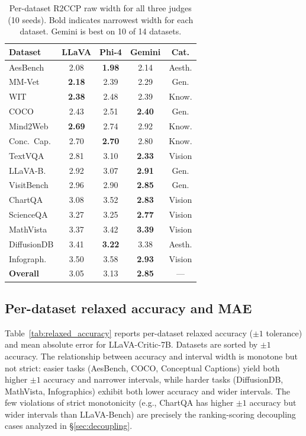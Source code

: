 \documentclass{article}
\begin{document}
\begin{table}[t]
\centering
\caption{Per-dataset R2CCP raw width for all three judges (10 seeds). Bold indicates narrowest width for each dataset. Gemini is best on 10 of 14 datasets.}
\label{tab:all_judges_per_dataset}
\small
\begin{tabular}{lcccc}
\toprule
\textbf{Dataset} & \textbf{LLaVA} & \textbf{Phi-4} & \textbf{Gemini} & \textbf{Cat.} \\
\midrule
AesBench & 2.08 & \textbf{1.98} & 2.14 & Aesth. \\
MM-Vet & \textbf{2.18} & 2.39 & 2.29 & Gen. \\
WIT & \textbf{2.38} & 2.48 & 2.39 & Know. \\
COCO & 2.43 & 2.51 & \textbf{2.40} & Gen. \\
Mind2Web & \textbf{2.69} & 2.74 & 2.92 & Know. \\
Conc.\ Cap. & 2.70 & \textbf{2.70} & 2.80 & Know. \\
TextVQA & 2.81 & 3.10 & \textbf{2.33} & Vision \\
LLaVA-B. & 2.92 & 3.07 & \textbf{2.91} & Gen. \\
VisitBench & 2.96 & 2.90 & \textbf{2.85} & Gen. \\
ChartQA & 3.08 & 3.52 & \textbf{2.83} & Vision \\
ScienceQA & 3.27 & 3.25 & \textbf{2.77} & Vision \\
MathVista & 3.37 & 3.42 & \textbf{3.39} & Vision \\
DiffusionDB & 3.41 & \textbf{3.22} & 3.38 & Aesth. \\
Infograph. & 3.50 & 3.58 & \textbf{2.93} & Vision \\
\midrule
\textbf{Overall} & 3.05 & 3.13 & \textbf{2.85} & --- \\
\bottomrule
\end{tabular}
\end{table}

\subsection{Per-dataset relaxed accuracy and MAE}
\label{app:relaxed}

Table~\ref{tab:relaxed_accuracy} reports per-dataset relaxed accuracy ($\pm 1$ tolerance) and mean absolute error for LLaVA-Critic-7B. Datasets are sorted by $\pm 1$ accuracy. The relationship between accuracy and interval width is monotone but not strict: easier tasks (AesBench, COCO, Conceptual Captions) yield both higher $\pm 1$ accuracy and narrower intervals, while harder tasks (DiffusionDB, MathVista, Infographics) exhibit both lower accuracy and wider intervals. The few violations of strict monotonicity (e.g., ChartQA has higher $\pm 1$ accuracy but wider intervals than LLaVA-Bench) are precisely the ranking-scoring decoupling cases analyzed in \S\ref{sec:decoupling}.
\end{document}
